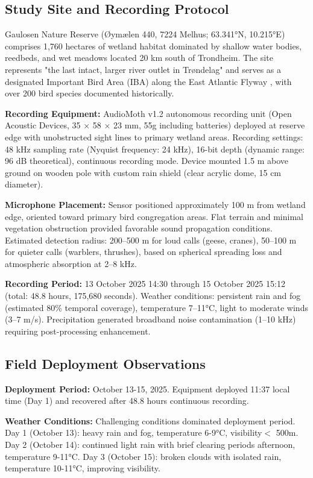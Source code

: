 \documentclass[twocolumn]{article}
\begin{document}
\subsection{Study Site and Recording Protocol}

Gaulosen Nature Reserve (Øymælen 440, 7224 Melhus; 63.341°N, 10.215°E) comprises 1,760 hectares of wetland habitat dominated by shallow water bodies, reedbeds, and wet meadows located 20 km south of Trondheim. The site represents "the last intact, larger river outlet in Trøndelag" and serves as a designated Important Bird Area (IBA) along the East Atlantic Flyway \citep{BirdLife2024}, with over 200 bird species documented historically.

\textbf{Recording Equipment:} AudioMoth v1.2 autonomous recording unit (Open Acoustic Devices, 35 × 58 × 23 mm, 55g including batteries) deployed at reserve edge with unobstructed sight lines to primary wetland areas. Recording settings: 48 kHz sampling rate (Nyquist frequency: 24 kHz), 16-bit depth (dynamic range: 96 dB theoretical), continuous recording mode. Device mounted 1.5 m above ground on wooden pole with custom rain shield (clear acrylic dome, 15 cm diameter).

\textbf{Microphone Placement:} Sensor positioned approximately 100 m from wetland edge, oriented toward primary bird congregation areas. Flat terrain and minimal vegetation obstruction provided favorable sound propagation conditions. Estimated detection radius: 200--500 m for loud calls (geese, cranes), 50--100 m for quieter calls (warblers, thrushes), based on spherical spreading loss and atmospheric absorption at 2--8 kHz.

\textbf{Recording Period:} 13 October 2025 14:30 through 15 October 2025 15:12 (total: 48.8 hours, 175,680 seconds). Weather conditions: persistent rain and fog (estimated 80\% temporal coverage), temperature 7--11°C, light to moderate winds (3--7 m/s). Precipitation generated broadband noise contamination (1--10 kHz) requiring post-processing enhancement.

\subsection{Field Deployment Observations}

\textbf{Deployment Period:} October 13-15, 2025. Equipment deployed 11:37 local time (Day 1) and recovered after 48.8 hours continuous recording.

\textbf{Weather Conditions:} Challenging conditions dominated deployment period. Day 1 (October 13): heavy rain and fog, temperature 6-9°C, visibility$<$ 500m. Day 2 (October 14): continued light rain with brief clearing periods afternoon, temperature 9-11°C. Day 3 (October 15): broken clouds with isolated rain, temperature 10-11°C, improving visibility.
\end{document}

